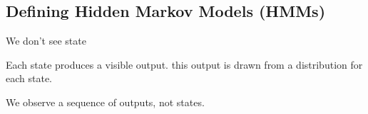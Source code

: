 
\subsection{Defining Hidden Markov Models (HMMs)}

We don't see state

Each state produces a visible output. this output is drawn from a distribution for each state.

We observe a sequence of outputs, not states.

